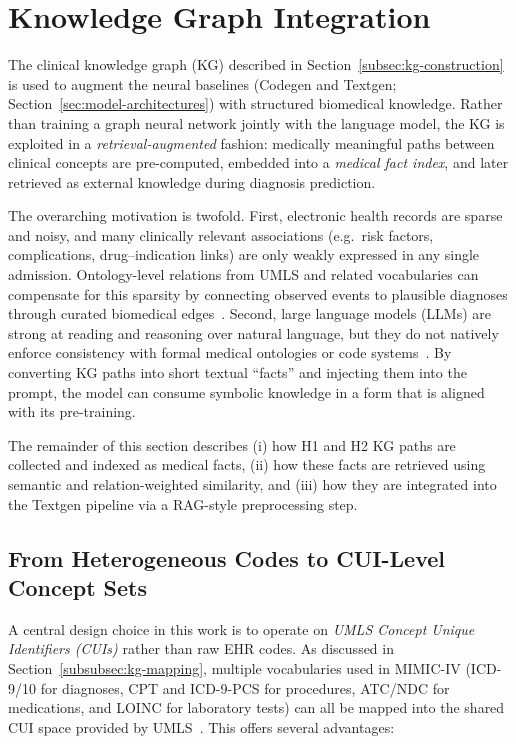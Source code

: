\section{Knowledge Graph Integration}
\label{sec:kg-integration}

The clinical knowledge graph (KG) described in Section~\ref{subsec:kg-construction} is used to augment the neural baselines (Codegen and Textgen; Section~\ref{sec:model-architectures}) with structured biomedical knowledge. Rather than training a graph neural network jointly with the language model, the KG is exploited in a \emph{retrieval-augmented} fashion: medically meaningful paths between clinical concepts are pre-computed, embedded into a \emph{medical fact index}, and later retrieved as external knowledge during diagnosis prediction.

The overarching motivation is twofold. First, electronic health records are sparse and noisy, and many clinically relevant associations (e.g.\ risk factors, complications, drug--indication links) are only weakly expressed in any single admission. Ontology-level relations from UMLS and related vocabularies can compensate for this sparsity by connecting observed events to plausible diagnoses through curated biomedical edges~\cite{bodenreider2004umls}. Second, large language models (LLMs) are strong at reading and reasoning over natural language, but they do not natively enforce consistency with formal medical ontologies or code systems~\cite{shen2024ehrsurvey}. By converting KG paths into short textual ``facts'' and injecting them into the prompt, the model can consume symbolic knowledge in a form that is aligned with its pre-training.

The remainder of this section describes (i) how H1 and H2 KG paths are collected and indexed as medical facts, (ii) how these facts are retrieved using semantic and relation-weighted similarity, and (iii) how they are integrated into the Textgen pipeline via a RAG-style preprocessing step.


\subsection{From Heterogeneous Codes to CUI-Level Concept Sets}
\label{subsec:fact-index-cuis}

A central design choice in this work is to operate on \emph{UMLS Concept Unique Identifiers (CUIs)} rather than raw EHR codes. As discussed in Section~\ref{subsubsec:kg-mapping}, multiple vocabularies used in MIMIC-IV (ICD-9/10 for diagnoses, CPT and ICD-9-PCS for procedures, ATC/NDC for medications, and LOINC for laboratory tests) can all be mapped into the shared CUI space provided by UMLS~\cite{bodenreider2004umls}. This offers several advantages:

